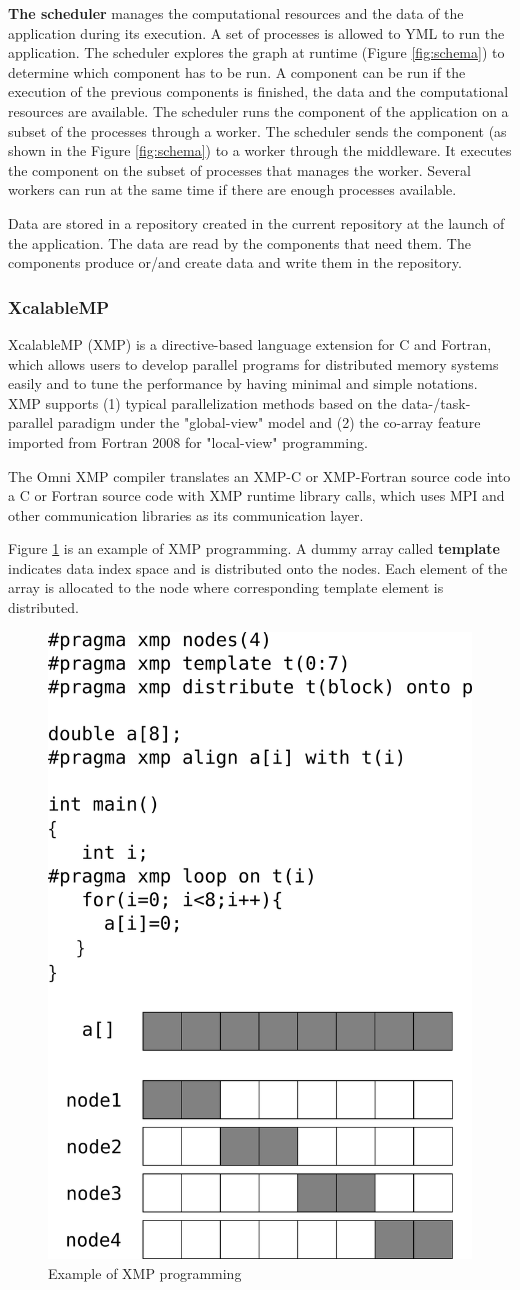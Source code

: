 \textbf{The scheduler} manages the computational resources and the data of the application during its execution.
A set of processes is allowed to YML to run the application.
The scheduler explores the graph at runtime (Figure \ref{fig:schema}) to determine which component has to be run.
A component can be run if the execution of the previous components is finished, the data and the computational resources are available.
The scheduler runs the component of the application on a subset of the processes through a worker.
The scheduler sends the component (as shown in the Figure \ref{fig:schema}) to a worker through the middleware.
It executes the component on the subset of processes that manages the worker.
Several workers can run at the same time if there are enough processes available.

Data are stored in a repository created in the current repository at the launch of the application.
The data are read by the components that need them.
The components produce or/and create data and write them in the repository.

\subsubsection{XcalableMP}
XcalableMP (XMP) \cite{XMP} is a directive-based language extension for C and Fortran,  which allows users to develop parallel programs for distributed memory systems easily and to tune the performance by having minimal and simple notations.
XMP supports (1) typical parallelization methods based on the data-/task-parallel paradigm under the "global-view" model and (2) the co-array feature imported from Fortran 2008 for "local-view" programming.

The Omni XMP compiler translates an XMP-C or XMP-Fortran source code into a C or Fortran source code with XMP runtime library calls, which uses MPI and other communication libraries as its communication layer.

Figure \ref{fig:xmpprog} is an example of XMP programming.
A dummy array called {\bf template} indicates data index space and is distributed onto the nodes.
Each element of the array is allocated to the node where corresponding template element is distributed.

\begin{figure}
	\centering
	\includegraphics[width=.35\textwidth]{xmp-example.pdf}
	\caption{Example of XMP programming \cite{GuTPS2019}\label{fig:xmpprog}}
\end{figure}

